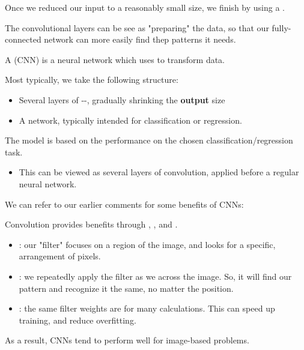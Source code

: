     Once we reduced our input to a reasonably small size, we finish by using a .

    The convolutional layers can be see as "preparing" the data, so that our fully-connected network can more easily find thep patterns it needs.
        \\

    \begin{definition}
        A  (CNN) is a neural network which uses  to transform data.

        Most typically, we take the following structure:

        \begin{itemize}
            \item Several layers of --, gradually shrinking the \textbf{output} size
            \item A  network, typically intended for classification or regression. 
        \end{itemize}

        The model is  based on the performance on the chosen classification/regression task.

        \subsecdiv

        \begin{itemize}
            \item This can be viewed as several layers of convolution, applied before a regular neural network.
        \end{itemize}
    \end{definition}

    We can refer to our earlier comments for some benefits of CNNs:\\

    \begin{concept}
        Convolution provides benefits through , , and .

        \begin{itemize}
            \item {}: our "filter" focuses on a  region of the image, and looks for a specific,  arrangement of pixels.
            \item {}: we repeatedly apply the  filter as we  across the image. So, it will find our pattern and recognize it the same, no matter the position.
            \item {}: the same filter weights are  for many calculations. This can speed up training, and reduce overfitting.
        \end{itemize}

        As a result, CNNs tend to perform well for image-based problems.
    \end{concept}

